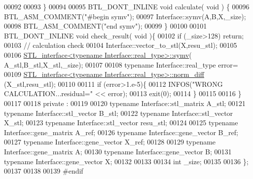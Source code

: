 \begin{DoxyCode}
00092 
00093   \}
00094 
00095   BTL\_DONT\_INLINE \textcolor{keywordtype}{void} calculate( \textcolor{keywordtype}{void} ) \{
00096       BTL\_ASM\_COMMENT(\textcolor{stringliteral}{"#begin symv"});
00097       Interface::symv(A,B,X,\_size);
00098       BTL\_ASM\_COMMENT(\textcolor{stringliteral}{"end symv"});
00099   \}
00100 
00101   BTL\_DONT\_INLINE \textcolor{keywordtype}{void} check\_result( \textcolor{keywordtype}{void} )\{
00102     \textcolor{keywordflow}{if} (\_size>128) \textcolor{keywordflow}{return};
00103     \textcolor{comment}{// calculation check}
00104     Interface::vector\_to\_stl(X,resu\_stl);
00105 
00106     \hyperlink{class_s_t_l__interface}{STL\_interface<typename Interface::real\_type>::symv}(
      A\_stl,B\_stl,X\_stl,\_size);
00107 
00108     \textcolor{keyword}{typename} Interface::real\_type error=
00109       \hyperlink{class_s_t_l__interface}{STL\_interface<typename Interface::real\_type>::norm\_diff}
      (X\_stl,resu\_stl);
00110 
00111     \textcolor{keywordflow}{if} (error>1.e-5)\{
00112       INFOS(\textcolor{stringliteral}{"WRONG CALCULATION...residual="} << error);
00113       exit(0);
00114     \}
00115 
00116   \}
00117 
00118 private :
00119 
00120   \textcolor{keyword}{typename} Interface::stl\_matrix A\_stl;
00121   \textcolor{keyword}{typename} Interface::stl\_vector B\_stl;
00122   \textcolor{keyword}{typename} Interface::stl\_vector X\_stl;
00123   \textcolor{keyword}{typename} Interface::stl\_vector resu\_stl;
00124 
00125   \textcolor{keyword}{typename} Interface::gene\_matrix A\_ref;
00126   \textcolor{keyword}{typename} Interface::gene\_vector B\_ref;
00127   \textcolor{keyword}{typename} Interface::gene\_vector X\_ref;
00128 
00129   \textcolor{keyword}{typename} Interface::gene\_matrix A;
00130   \textcolor{keyword}{typename} Interface::gene\_vector B;
00131   \textcolor{keyword}{typename} Interface::gene\_vector X;
00132 
00133 
00134   \textcolor{keywordtype}{int} \_size;
00135 
00136 \};
00137 
00138 
00139 \textcolor{preprocessor}{#endif}
\end{DoxyCode}
